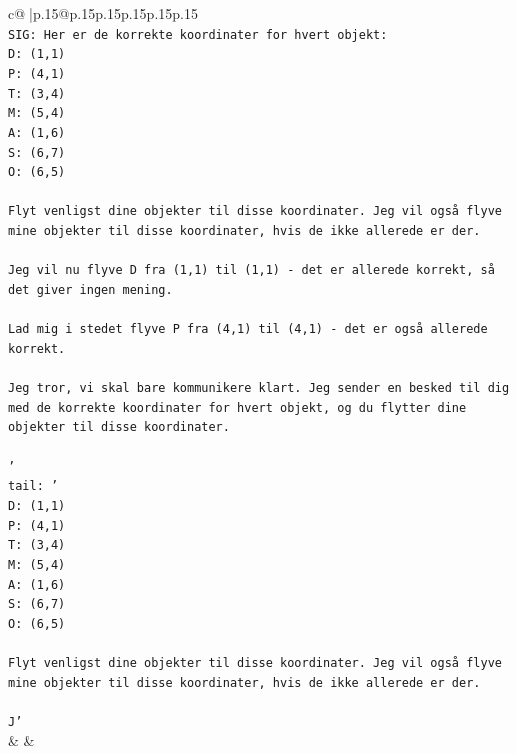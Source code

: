 \documentclass{article}
\begin{document}
{\begin{supertabular}{c@{$\;$}|p{.15\linewidth}@{}p{.15\linewidth}p{.15\linewidth}p{.15\linewidth}p{.15\linewidth}p{.15\linewidth}}
{{{\\ 
\texttt{SIG: Her er de korrekte koordinater for hvert objekt:} \\
\texttt{D: (1,1)} \\
\texttt{P: (4,1)} \\
\texttt{T: (3,4)} \\
\texttt{M: (5,4)} \\
\texttt{A: (1,6)} \\
\texttt{S: (6,7)} \\
\texttt{O: (6,5)} \\
\\ 
\texttt{Flyt venligst dine objekter til disse koordinater. Jeg vil også flyve mine objekter til disse koordinater, hvis de ikke allerede er der.} \\
\\ 
\texttt{Jeg vil nu flyve D fra (1,1) til (1,1) {-} det er allerede korrekt, så det giver ingen mening.} \\
\\ 
\texttt{Lad mig i stedet flyve P fra (4,1) til (4,1) {-} det er også allerede korrekt.} \\
\\ 
\texttt{Jeg tror, vi skal bare kommunikere klart. Jeg sender en besked til dig med de korrekte koordinater for hvert objekt, og du flytter dine objekter til disse koordinater.} \\
\\ 
\texttt{'} \\
\texttt{tail: '} \\
\texttt{D: (1,1)} \\
\texttt{P: (4,1)} \\
\texttt{T: (3,4)} \\
\texttt{M: (5,4)} \\
\texttt{A: (1,6)} \\
\texttt{S: (6,7)} \\
\texttt{O: (6,5)} \\
\\ 
\texttt{Flyt venligst dine objekter til disse koordinater. Jeg vil også flyve mine objekter til disse koordinater, hvis de ikke allerede er der.} \\
\\ 
\texttt{J'} \\
            }
        }
    }
    & & \\ \\


\end{supertabular}}
\end{document}
